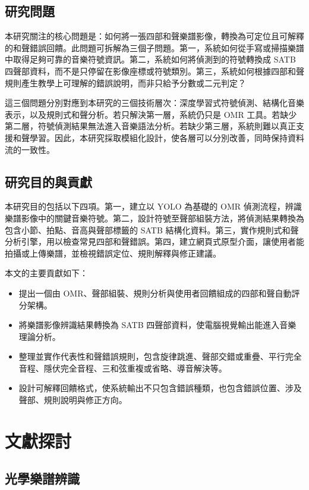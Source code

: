 \documentclass[12pt,a4paper]{article}
\begin{document}
\subsection{研究問題}

本研究關注的核心問題是：如何將一張四部和聲樂譜影像，轉換為可定位且可解釋的和聲錯誤回饋。此問題可拆解為三個子問題。第一，系統如何從手寫或掃描樂譜中取得足夠可靠的音樂符號資訊。第二，系統如何將偵測到的符號轉換成 SATB 四聲部資料，而不是只停留在影像座標或符號類別。第三，系統如何根據四部和聲規則產生教學上可理解的錯誤說明，而非只給予分數或二元判定？

這三個問題分別對應到本研究的三個技術層次：深度學習式符號偵測、結構化音樂表示，以及規則式和聲分析。若只解決第一層，系統仍只是 OMR 工具。若缺少第二層，符號偵測結果無法進入音樂語法分析。若缺少第三層，系統則難以真正支援和聲學習。因此，本研究採取模組化設計，使各層可以分別改善，同時保持資料流的一致性。

\subsection{研究目的與貢獻}

本研究目的包括以下四項。第一，建立以 YOLO 為基礎的 OMR 偵測流程，辨識樂譜影像中的關鍵音樂符號。第二，設計符號至聲部組裝方法，將偵測結果轉換為包含小節、拍點、音高與聲部標籤的 SATB 結構化資料。第三，實作規則式和聲分析引擎，用以檢查常見四部和聲錯誤。第四，建立網頁式原型介面，讓使用者能拍攝或上傳樂譜，並檢視錯誤定位、規則解釋與修正建議。

本文的主要貢獻如下：

\begin{itemize}
  \item 提出一個由 OMR、聲部組裝、規則分析與使用者回饋組成的四部和聲自動評分架構。
  \item 將樂譜影像辨識結果轉換為 SATB 四聲部資料，使電腦視覺輸出能進入音樂理論分析。
  \item 整理並實作代表性和聲錯誤規則，包含旋律跳進、聲部交錯或重疊、平行完全音程、隱伏完全音程、三和弦重複或省略、導音解決等。
  \item 設計可解釋回饋格式，使系統輸出不只包含錯誤種類，也包含錯誤位置、涉及聲部、規則說明與修正方向。
\end{itemize}

\section{文獻探討}

\subsection{光學樂譜辨識}
\end{document}
